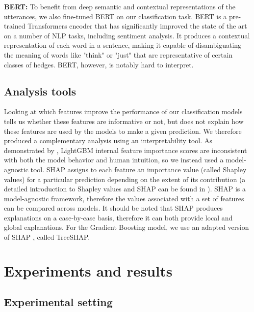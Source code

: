 \documentclass[11pt]{article}
\begin{document}
\noindent\textbf{BERT:} To benefit from deep semantic and contextual representations of the utterances, we also fine-tuned BERT \cite{Devlin2019} on our classification task. BERT is a pre-trained Transformers encoder \cite{Vaswani2017} that has significantly improved the state of the art on a number of NLP tasks, including sentiment analysis. It produces a contextual representation of each word in a sentence, making it capable of disambiguating the meaning of words like "think" or "just" that are representative of certain classes of hedges. BERT, however, is notably hard to interpret.

\subsection{Analysis tools}

Looking at which features improve the performance of our classification models tells us whether these features are informative or not, but does not explain how these features are used by the models to make a given prediction. We therefore produced a complementary analysis using an interpretability tool. As demonstrated by \cite{Lundberg2017}, LightGBM internal feature importance scores are inconsistent with both the model behavior and human intuition, so we instead used a model-agnostic tool. 
\noindent SHAP \cite{Lundberg2017} assigns to each feature an importance value (called Shapley values) for a particular prediction depending on the extent of its contribution (a detailed introduction to Shapley values and SHAP can be found in \citet{Molnar2020}). SHAP is a model-agnostic framework, therefore the values associated with a set of features can be compared across models. It should be noted that SHAP produces explanations on a case-by-case basis, therefore it can both provide local and global explanations. For the Gradient Boosting model, we use an adapted version of SHAP \cite{Lundberg2018}, called TreeSHAP.

\section{Experiments and results}

\subsection{Experimental setting}
\end{document}
